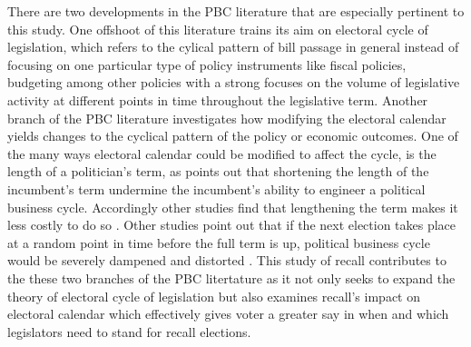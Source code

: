 \documentclass{article}
\begin{document}
		
		There are two developments in the PBC literature that are especially pertinent to this study.
		One offshoot of
		this
		literature
		trains its aim on
		electoral cycle of legislation,
		which refers to
		the cylical pattern of bill passage
		in general
		\autocite{lagonaOppositeCyclesLaws,
			lagonaPoliticalLegislationCycle2008,
			brechlerPoliticalLegislationCycle2014,
			wittmanMythDemocraticFailure1995}
		instead of focusing on one particular type of policy instruments
		like fiscal policies, budgeting among other policies
		with a strong focuses on
		the volume of legislative activity at different points in time
		throughout the legislative term.
		Another branch of the PBC literature investigates how
		modifying the electoral calendar
		yields changes to the cyclical pattern of the policy or economic outcomes.
		One of the many ways electoral calendar could be modified to affect the cycle,
		is the length of a politician's term,
		as
		\citeauthor{nordhausPoliticalBusinessCycle1975}
		\autocite*{nordhausPoliticalBusinessCycle1975}
		points out that shortening the length of the incumbent's term
		undermine the incumbent's ability to engineer a political business cycle.
		Accordingly other studies find that lengthening the term
		makes it less costly to do so
		\autocite
		{amacherCyclesSenatorialVoting1978,
			macraePoliticalModelBusiness1977}.
		Other studies
		point out that if the next election takes place
		at a random point in time before the full term is up,
		political business cycle would be severely dampened and distorted
		\autocite{ginsburghRandomTimingElections1983,lindbeckStabilizationPolicyOpen1976}.
		This
		study of recall contributes to the these two branches of the
		PBC
		litertature
		as it
		not only seeks to expand the theory
		of electoral cycle of legislation
		but also examines recall's impact on electoral calendar
		which effectively gives voter
		a greater say in when and which legislators
		need to stand for recall elections.
		
		
		
		
		
		
		
		
		
		
		
		
		
\end{document}
